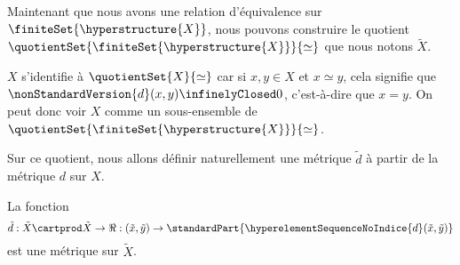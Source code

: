 Maintenant que nous avons une relation d'équivalence sur
$\finiteSet{\hyperstructure{X}}$, nous pouvons construire le quotient
$\quotientSet{\finiteSet{\hyperstructure{X}}}{\simeq}$ que nous notons
$\tilde{X}$.

\begin{remarque}
	$X$ s'identifie à $\quotientSet{X}{\simeq}$ car si $x, y \in X$ et $x \simeq
	y$, cela signifie que $\nonStandardVersion{d}(x, y) \infinelyClosed 0$,
	c'est-à-dire que $x = y$. On peut donc voir $X$ comme un sous-ensemble de
	$\quotientSet{\finiteSet{\hyperstructure{X}}}{\simeq}$.
\end{remarque}

Sur ce quotient, nous
allons définir naturellement une métrique $\tilde{d}$ à partir de la métrique $d$ sur $X$.

\begin{proposition}
	La fonction
	\begin{equation}
		\tilde{d} : \tilde{X} \cartprod \tilde{X} \rightarrow \real :
		(\tilde{x}, \tilde{y}) \rightarrow
		\standardPart{\hyperelementSequenceNoIndice{d}(\tilde{x}, \tilde{y})}
	\end{equation}
	est une métrique sur $\tilde{X}$.
\end{proposition}

